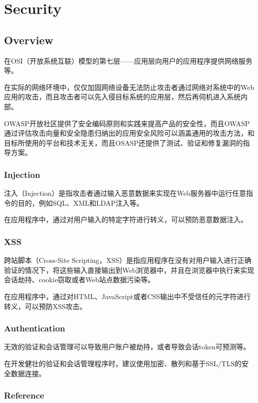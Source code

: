 \part{Security}


\chapter{Overview}

在OSI（开放系统互联）模型的第七层——应用层向用户的应用程序提供网络服务等。

在实际的网络环境中，仅仅加固网络设备无法防止攻击者通过网络对系统中的Web应用的攻击，而且攻击者可以先入侵目标系统的应用层，然后再伺机进入系统内部。

OWASP开放社区提供了安全编码原则和实践来提高产品的安全性，而且OWASP通过评估攻击向量和安全隐患归纳出的应用安全风险可以涵盖通用的攻击方法，和目标所使用的平台和技术无关，而且OSASP还提供了测试、验证和修复漏洞的指导方案。

\section{Injection}


注入（Injection）是指攻击者通过输入恶意数据来实现在Web服务器中运行任意指令的目的，例如SQL、XML和LDAP注入等。

在应用程序中，通过对用户输入的特定字符进行转义，可以预防恶意数据注入。

\section{XSS}


跨站脚本（Cross-Site Scripting，XSS）是指应用程序在没有对用户输入进行正确验证的情况下，将这些输入直接输出到Web浏览器中，并且在浏览器中执行来实现会话劫持、cookie窃取或者Web站点数据污染等。

在应用程序中，通过对HTML、JavaScript或者CSS输出中不受信任的元字符进行转义，可以预防XSS攻击。


\section{Authentication}

无效的验证和会话管理可以导致用户账户被劫持，或者导致会话token可预测等。

在开发健壮的验证和会话管理程序时，建议使用加密、散列和基于SSL/TLS的安全数据连接。


\section{Reference}

